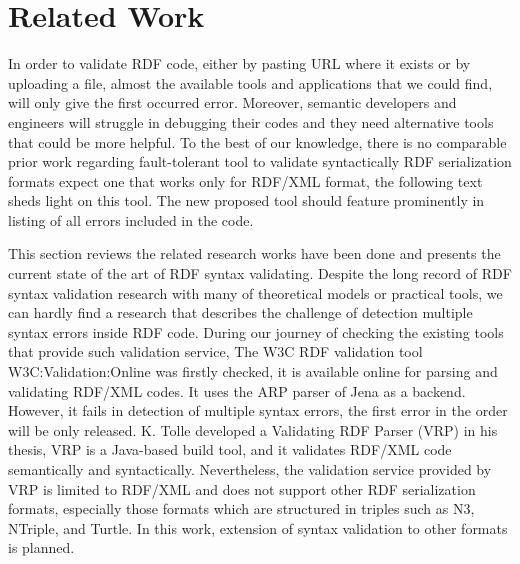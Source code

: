 \chapter{Related Work}
\label{ch:related}



In order to validate RDF code, either by pasting URL where it exists or by uploading a file, almost the available tools and applications that we could find, will only give the first occurred error. Moreover, semantic developers and engineers will struggle in debugging their codes and they need alternative tools that could be more helpful. To the best of our knowledge, there is no comparable prior work regarding fault-tolerant tool to validate syntactically RDF serialization formats expect one that works only for RDF/XML format, the following text sheds light on this tool. The new proposed tool should feature prominently in listing of all errors included in the code.
	\vspace{5mm} %
\par This section reviews the related research works have been done and presents the current state of the art of RDF syntax validating. Despite the long record of RDF syntax validation research with many of theoretical models or practical tools, we can hardly find a research that describes the challenge of detection multiple syntax errors inside RDF code. During our journey of checking the existing tools that provide such validation service, The W3C RDF validation tool \cite{bibid}{W3C:Validation:Online} was firstly checked, it is available online for parsing and validating RDF/XML codes. It uses the ARP parser of Jena \cite{McBride:2002:JSW:613357.613755} as a backend. However, it fails in detection of multiple syntax errors, the first error in the order will be only released. K. Tolle developed a Validating RDF Parser (VRP) \cite{karsten:Thesis:2000} in his thesis, VRP is a Java-based build tool, and it validates RDF/XML code semantically and syntactically. Nevertheless, the validation service provided by VRP is limited to RDF/XML and does not support other RDF serialization formats, especially those formats which are structured in triples such as N3, NTriple, and Turtle. In this work, extension of syntax validation to other formats is planned. 
	\vspace{5mm} %
